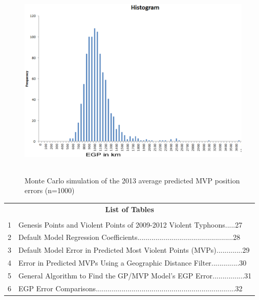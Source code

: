 \documentclass[a4paper, 12pt]{article}
\begin{document}
{ \begin{figure}[!htpb]
 \centering
\includegraphics[width=5.5in,height=3.75in]{violentfig4.eps}
\caption{Monte Carlo simulation of the 2013 average predicted MVP position errors (n=1000)}
\vspace{5in}
\label{fig3}
\end{figure}



\newpage

\begin{table}[!htpb]
\centering
\begin{tabular}{ll}
\multicolumn{2}{c}{{\bf \large List of Tables}}\\
& \\
1 & Genesis Points and Violent Points of 2009-2012 Violent Typhoons.....27 \\
2 & Default Model Regression Coefficients................................................28\\
3 & Default Model Error in Predicted Most Violent Points (MVPs).............29\\
4 & Error in Predicted MVPs Using a Geographic Distance Filter..............30\\
5 &  General Algorithm to Find the  GP/MVP Model's EGP Error................31\\
6 &  EGP Error Comparisons......................................................................32\\

\end{tabular}
\end{table}


}
\end{document}
